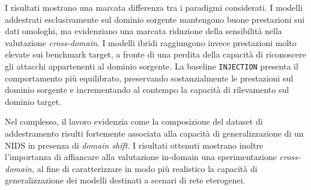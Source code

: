 I risultati mostrano una marcata differenza tra i paradigmi considerati.
I modelli addestrati esclusivamente sul dominio sorgente mantengono buone prestazioni sui dati omologhi, ma evidenziano una marcata riduzione della sensibilità nella valutazione \textit{cross-domain}. 
I modelli ibridi raggiungono invece prestazioni molto elevate sui benchmark target, a fronte di una perdita della capacità di riconoscere gli attacchi appartenenti al dominio sorgente. 
La baseline \texttt{INJECTION} presenta il comportamento più equilibrato, preservando sostanzialmente le prestazioni sul dominio sorgente e incrementando al contempo la capacità di rilevamento sul dominio target.

Nel complesso, il lavoro evidenzia come la composizione del dataset di addestramento risulti fortemente associata alla capacità di generalizzazione di un NIDS in presenza di \textit{domain shift}.
I risultati ottenuti mostrano inoltre l'importanza di affiancare alla valutazione in-domain una sperimentazione \textit{cross-domain}, al fine di caratterizzare in modo più realistico la capacità di generalizzazione dei modelli destinati a scenari di rete eterogenei.
